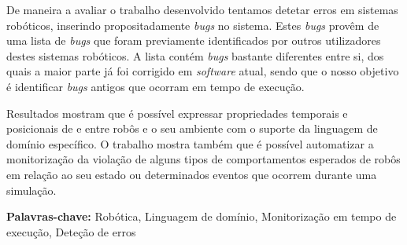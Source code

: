 De maneira a avaliar o trabalho desenvolvido tentamos detetar erros em sistemas robóticos, inserindo propositadamente \textit{bugs} no sistema. Estes \textit{bugs} provêm de uma lista de \textit{bugs} que foram previamente identificados por outros utilizadores destes sistemas robóticos. A lista contém \textit{bugs} bastante diferentes entre si, dos quais a maior parte já foi corrigido em \textit{software} atual, sendo que o nosso objetivo é identificar \textit{bugs} antigos que ocorram em tempo de execução.

Resultados mostram que é possível expressar propriedades temporais e posicionais de e entre robôs e o seu ambiente com o suporte da linguagem de domínio específico. O trabalho mostra também que é possível automatizar a monitorização da violação de alguns tipos de comportamentos esperados de robôs em relação ao seu estado ou determinados eventos que ocorrem durante uma simulação.



\vfill

\begin{flushleft}
\textbf{Palavras-chave:}
Robótica, Linguagem de domínio, Monitorização em tempo de execução, Deteção de erros
\end{flushleft}

